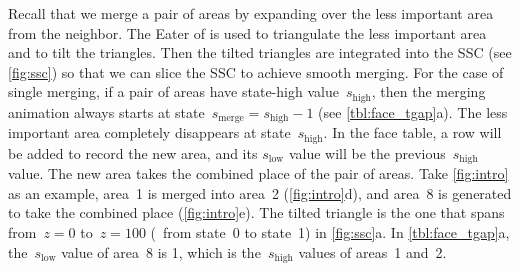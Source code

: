 \documentclass[twocolumn]{svjour3}          %
\begin{document}
Recall that we merge a pair of areas by expanding over 
the less important area from the neighbor.
The Eater of \citet{Suba2014Merge} is used to 
triangulate the less important area and to tilt the triangles.
Then the tilted triangles are integrated into the SSC
(see \fig\ref{fig:ssc})
so that we can slice the SSC to achieve smooth merging.
For the case of single merging,
if a pair of areas have state-high value~$s_\mathrm{high}$,
then the merging animation 
always starts at state~$s_\mathrm{merge}=s_\mathrm{high}-1$
(see \tabl\ref{tbl:face_tgap}a).
The less important area completely disappears
at state~$s_\mathrm{high}$.
In the face table, a row will be added to record the new area, 
and its $s_\mathrm{low}$ value will be the previous~$s_\mathrm{high}$ value.
The new area takes the combined place of the pair of areas.
Take \fig\ref{fig:intro} as an example, 
area~1 is merged into area~2 (\fig\ref{fig:intro}d), 
and area~8 is generated to take the combined place (\fig\ref{fig:intro}e).
The tilted triangle is the one that spans 
from~$z= 0$ to~$z=100$ (\ie~from state~0 to state~1)
in \fig\ref{fig:ssc}a.
In \tabl\ref{tbl:face_tgap}a, 
the~$s_\mathrm{low}$ value of area~8 is 1,
which is the~$s_\mathrm{high}$ values of areas~1 and~2.
\end{document}
